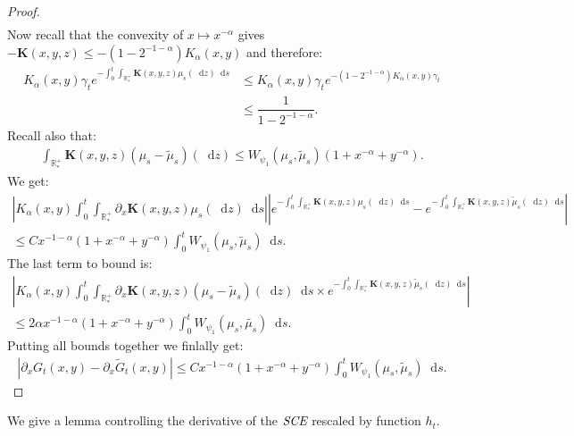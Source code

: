 \documentclass[11pt,a4paper]{article}
\newcommand{\RRP}{\mathbb{R}^+_*}
\newcommand{\SCE}{\emph{SCE}}
\newcommand{\dd}{\mathop{}\!\mathrm{d}}
\begin{document}
\begin{proof}
\begin{multline*}
    \end{multline*}
    Now recall that the convexity of $x \mapsto x^{-\alpha}$ gives $-\mathbf{K}(x,y,z) \leq - (1-2^{-1-\alpha}) K_\alpha(x,y)$ and therefore:
    \begin{align*}
        K_\alpha(x,y) \gamma_t e^{-\int_0^t \int_{\RRP}\mathbf{K}(x,y,z)\mu_s(\dd z) \dd s} 
        &\leq K_\alpha(x,y) \gamma_t e^{-(1-2^{-1-\alpha}) K_\alpha(x,y)\gamma_t} \\
        &\leq \dfrac{1}{1-2^{-1-\alpha}}.
    \end{align*}
    Recall also that:
    \begin{align*}
        \int_{\RRP}\mathbf{K}(x,y,z)(\mu_s-\tilde{\mu}_s)(\dd z) \leq W_{\psi_1}(\mu_s,\tilde{\mu}_s) (1 + x^{-\alpha} + y^{-\alpha}).
    \end{align*}
    We get:
    \begin{multline*}
        \left| K_\alpha(x,y) \int_0^t \int_{\RRP} \partial_x \mathbf{K}(x,y,z)\mu_s(\dd z) \dd s \right|
        \left|e^{-\int_0^t \int_{\RRP}\mathbf{K}(x,y,z)\mu_s(\dd z) \dd s} - e^{-\int_0^t \int_{\RRP}\mathbf{K}(x,y,z)\tilde{\mu}_s(\dd z) \dd s}\right| \\
        \leq C x^{-1-\alpha} (1 + x^{-\alpha} + y^{-\alpha}) \int_0^t  W_{\psi_1}(\mu_s,\tilde{\mu}_s) \dd s.
    \end{multline*}
    The last term to bound is:
    \begin{multline*}
        \left| K_\alpha(x,y) \int_0^t \int_{\RRP} \partial_x \mathbf{K}(x,y,z)\left(\mu_s - \tilde{\mu}_s \right)(\dd z) \dd s \times e^{-\int_0^t \int_{\RRP}\mathbf{K}(x,y,z)\tilde{\mu}_s(\dd z) \dd s} \right| \\
        \leq 2\alpha x^{-1-\alpha}\left( 1 + x^{-\alpha} + y^{-\alpha}\right) \int_0^t W_{\psi_1}(\mu_s,\tilde{\mu_s}) \dd s.
    \end{multline*}
    Putting all bounds together we finlally get:
    \begin{align*}
        \left| \partial_x G_t(x,y)- \partial_x \tilde{G}_t(x,y)\right| \leq C x^{-1-\alpha} (1 + x^{-\alpha} + y^{-\alpha}) \int_0^t  W_{\psi_1}(\mu_s,\tilde{\mu}_s) \dd s.
    \end{align*}
\end{proof}
We give a lemma controlling the derivative of the $\SCE$ rescaled by function $h_t$.
\end{document}
